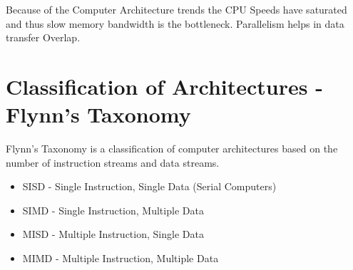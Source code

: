 \documentclass[12pt]{article}
\begin{document}
Because of the Computer Architecture trends the CPU Speeds have saturated and thus slow memory bandwidth is the bottleneck.
Parallelism helps in data transfer Overlap.

\section{Classification of Architectures - Flynn's Taxonomy}
Flynn's Taxonomy is a classification of computer architectures based on the number of instruction streams and data streams.
\begin{itemize}
    \item SISD - Single Instruction, Single Data (Serial Computers)
    \item SIMD - Single Instruction, Multiple Data
    \item MISD - Multiple Instruction, Single Data
    \item MIMD - Multiple Instruction, Multiple Data
\end{itemize}
\end{document}
